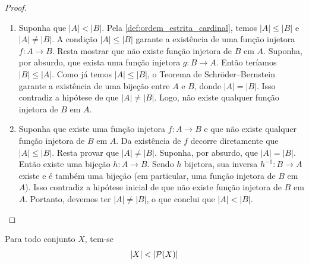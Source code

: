 \begin{proof}
    \begin{enumerate}
        \item[\((\implies)\)] Suponha que \(|A| < |B|\). Pela \autoref{def:ordem_estrita_cardinal}, temos \(|A| \leq |B|\) e \(|A| \neq |B|\). A condição \(|A| \leq |B|\) garante a existência de uma função injetora \(f: A \to B\). Resta mostrar que não existe função injetora de \(B\) em \(A\). Suponha, por absurdo, que exista uma função injetora \(g: B \to A\). Então teríamos \(|B| \leq |A|\). Como já temos \(|A| \leq |B|\), o Teorema de Schröder--Bernstein garante a existência de uma bijeção entre \(A\) e \(B\), donde \(|A| = |B|\). Isso contradiz a hipótese de que \(|A| \neq |B|\). Logo, não existe qualquer função injetora de \(B\) em \(A\).

        \item[\((\impliedby)\)] Suponha que existe uma função injetora \(f: A \to B\) e que não existe qualquer função injetora de \(B\) em \(A\). Da existência de \(f\) decorre diretamente que \(|A| \leq |B|\). Resta provar que \(|A| \neq |B|\). Suponha, por absurdo, que \(|A| = |B|\). Então existe uma bijeção \(h: A \to B\). Sendo \(h\) bijetora, sua inversa \(h^{-1}: B \to A\) existe e é também uma bijeção (em particular, uma função injetora de \(B\) em \(A\)). Isso contradiz a hipótese inicial de que não existe função injetora de \(B\) em \(A\). Portanto, devemos ter \(|A| \neq |B|\), o que conclui que \(|A| < |B|\).
    \end{enumerate}
\end{proof}

\begin{teorema}
    \label{teo:cantor_ordem_estrita}
    Para todo conjunto \(X\), tem-se
    \[
        |X| < |\mathcal{P}(X)|
    \]
\end{teorema}

